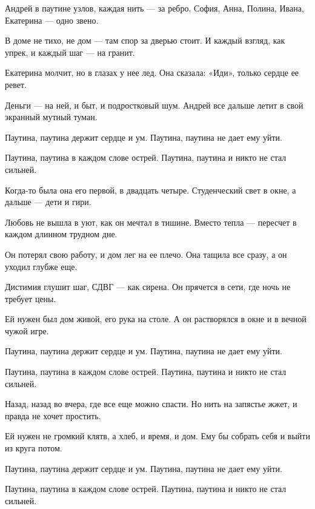 \begin{lyrics}
Андрей в паутине узлов,
каждая нить — за ребро.
София, Анна, Полина,
Ивана, Екатерина — одно звено.

В доме не тихо, не дом —
там спор за дверью стоит.
И каждый взгляд, как упрек,
и каждый шаг — на гранит.

Екатерина молчит,
но в глазах у нее лед.
Она сказала: «Иди»,
только сердце ее ревет.

Деньги — на ней, и быт,
и подростковый шум.
Андрей все дальше летит
в свой экранный мутный туман.

Паутина, паутина
держит сердце и ум.
Паутина, паутина
не дает ему уйти.

Паутина, паутина
в каждом слове острей.
Паутина, паутина
и никто не стал сильней.

Когда-то была она
его первой, в двадцать четыре.
Студенческий свет в окне,
а дальше — дети и гири.

Любовь не вышла в уют,
как он мечтал в тишине.
Вместо тепла — пересчет
в каждом длинном трудном дне.

Он потерял свою работу,
и дом лег на ее плечо.
Она тащила все сразу,
а он уходил глубже еще.

Дистимия глушит шаг,
СДВГ — как сирена.
Он прячется в сети,
где ночь не требует цены.

Ей нужен был дом живой,
его рука на столе.
А он растворялся в окне
и в вечной чужой игре.

Паутина, паутина
держит сердце и ум.
Паутина, паутина
не дает ему уйти.

Паутина, паутина
в каждом слове острей.
Паутина, паутина
и никто не стал сильней.

Назад, назад во вчера,
где все еще можно спасти.
Но нить на запястье жжет,
и правда не хочет простить.

Ей нужен не громкий клятв,
а хлеб, и время, и дом.
Ему бы собрать себя
и выйти из круга потом.

Паутина, паутина
держит сердце и ум.
Паутина, паутина
не дает ему уйти.

Паутина, паутина
в каждом слове острей.
Паутина, паутина
и никто не стал сильней.
\end{lyrics}


